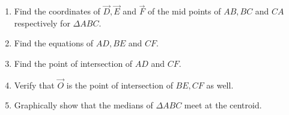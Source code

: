 \begin{enumerate}[label=\arabic*.,ref=\thesubsection.\theenumi]
\begin{figure}
\caption{}
\label{fig:alt_triangle}
\end{figure}
\item
Find the coordinates of $\vec{D}, \vec{E}$ and $\vec{F}$ of the mid points of $AB, BC$ and $CA$ respectively 
for  $\Delta ABC$. 
\item
Find the equations of $AD,BE$ and $CF$. 
%
\item
\label{prob:median}
Find the point of intersection of $AD$ and $CF$.
\item
Verify that $\vec{O}$ is the point of intersection of $BE,CF$ as 
well.
\item
Graphically show that the medians of $\Delta ABC$ meet at the centroid.
\end{enumerate}

